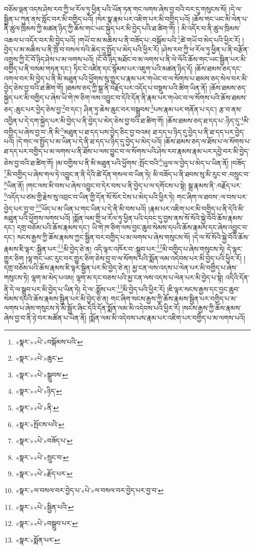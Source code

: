 བཅོམ་ལྡན་འདས་ཤེས་རབ་ཀྱི་ཕ་རོལ་ཏུ་ཕྱིན་པའི་ཡོན་ཏན་གང་ལགས་ཞེས་བྱ་བའི་བར་དུ་གསུངས་སོ། །དེ་ལ་སྦྱིན་པ་ཀུན་ནས་སློང་བར་མི་བགྱིད་པའོ། །སེར་སྣ་རྣམ་པར་འཇིག་པར་མི་བགྱིད་པའོ། །ཆོས་གང་ཡང་མི་ལེན་པ་ནི་ཚུལ་ཁྲིམས་ཀྱི་མཚན་ཉིད་ཀྱི་ཆོས་གང་ཡང་སྐྱེད་པར་མི་བྱེད་པའི་ཐ་ཚིག་གོ། །
མི་འདོར་བ་ནི་ཚུལ་ཁྲིམས་འཆལ་པ་འདོར་བར་མི་བྱེད་པའོ། །གཡོ་བ་མ་མཆིས་པ་ནི་བཟོད་པ་:བསྒོམ་པའི་\footnote{«སྣར་»«པེ་»བསྒོམས་པའི་}ཚེ་གཡོ་བ་མེད་པའི་ཕྱིར་རོ། །བྱེད་པ་མ་མཆིས་པ་ནི་ཁྲོ་བ་བསལ་བའི་ཆེད་དུ་སྤྱོད་པ་མེད་པའི་ཕྱིར་རོ། །ཤེས་རབ་ཀྱི་ཕ་རོལ་ཏུ་ཕྱིན་པ་ནི་བརྩོན་འགྲུས་ཀྱི་ངོ་བོ་ཉིད་ཤེས་པ་མ་ལགས་པའོ། །ངོ་བོ་ཉིད་མཐོང་བ་མ་ལགས་པ་ནི་ལེ་ལོའི་ཆོས་གང་ཡང་སྦྱིན་པར་མི་བགྱིད་པ་ནི་བསམ་གཏན་དང་། ཏིང་ངེ་འཛིན་དང་སྙོམས་པར་འཇུག་པའི་མཚན་ཉིད་དོ། །ཆོས་ཐམས་ཅད་དང་འགལ་བར་མི་བྱེད་པ་ནི་མི་མཐུན་པའི་ཕྱོགས་སུ་གྱུར་པ་རྣམ་པར་གཡེང་བ་ལ་སོགས་པ་ཐམས་ཅད་སེལ་བར་མི་བྱེད་ཅེས་བྱ་བའི་ཐ་ཚིག་གོ། །ཐམས་ཅད་ཀྱི་སྒྲ་ནི་བརྗོད་པར་འདོད་པ་བསྡུས་པའི་ཚིག་ཡིན་ནོ། །ཆོས་ཐམས་ཅད་སྐྱེད་པར་མི་བགྱིད་པ་ཞེས་ཡི་གེ་ཁ་ཅིག་ལས་འབྱུང་བ་དེའི་དོན་ནི་རྣམ་པར་གཡེང་བ་ལ་སོགས་པའི་ཆོས་ཐམས་ཅད་:ཆུང་པར་བྱེད་ཅེས་བྱ་\footnote{«སྣར་»«པེ་»ཆུང་}བ་དང་། ཤིན་ཏུ་ཆེས་ཆུང་བར་བསྒྲུབས་\footnote{«སྣར་»«པེ་»སྒྲུབས་}པས་རྣམ་པར་གནོན་པ་དང་། རྩ་བ་ནས་འབྱིན་པ་དེ་དག་སྐྱེད་པར་མི་བྱེད་པ་ནི་བྱེད་པ་མེད་ཅེས་བྱ་བའི་ཐ་ཚིག་གོ། །ཆོས་ཐམས་ཅད་ཐ་དད་པ་:ཉིད་དུ་\footnote{«སྣར་»«པེ་»ཉིད་}མི་བགྱིད་པ་ཞེས་བྱ་བ་:ནི་མི་\footnote{«སྣར་»«པེ་»ནི་}མཐུན་པ་ཐ་དད་པས་བྱེད་ཅིང་བྱ་བའམ། ཐ་དད་པ་ཉིད་དུ་བྱེད་པ་ནི་ཐ་དད་པར་བྱེད་པའོ། །དེ་གང་ལ་སྤྱོད་པ་མ་ཡིན་པ་དེ་ནི་ཐ་དད་པ་ཉིད་དུ་བྱེད་པ་མེད་པའོ། །ཆོས་ཐམས་ཅད་ལ་ཐོས་པ་ལ་སོགས་པ་ཐ་དད་པར་བགྱིད་པ་མ་ལགས་པ་ནི་ཐོས་པ་ལས་བྱུང་བ་ལ་སོགས་པའི་ཤེས་རབ་རྣམས་རྣམ་པར་དབྱེ་བར་མི་བྱེད་ཅེས་བྱ་བའི་ཐ་ཚིག་གོ། །མ་བགྱིས་པ་ནི་མི་མཐུན་པའི་ཕྱོགས་:སྤོང་བའི་\footnote{«སྣར་»སྤོངས་པའི་}ཡུལ་ལ་བྱེད་པ་མེད་པ་ཡིན་ནོ། །བཟོད་\footnote{«སྣར་»«པེ་»བཟོད་པ་}མི་བགྱིད་པ་ཞེས་གལ་ཏེ་འབྱུང་ན་ནི་དེའི་ཚེ་དོན་གསལ་བ་ཡིན་ཏེ། མི་བཟོད་པ་ནི་ཐབས་སུ་མི་རུང་བ་:བསྲུང་བ་\footnote{«སྣར་»«པེ་»སྲུང་བ་}ཡིན་ནོ། །གང་ལས་མི་བས་པ་ཞེས་འབྱུང་བ་དེར་བས་པ་ནི་བྱེད་པ་ལ་དགོངས་པ་སྟེ། སྒྲ་རྣམས་ནི་:བརྗོད་པར་\footnote{«སྣར་»«པེ་»རྗོད་པར་}འདོད་པ་ཙམ་གྱི་རྗེས་སུ་འབྲང་བ་ཡིན་གྱི་དོན་སོ་སོར་ངེས་པ་མེད་པའི་ཕྱིར་ཏེ། གང་ཞིག་ལ་ཐབས་:ལ་བས་པར་བྱེད་པར་བྱ་བ་\footnote{«སྣར་»ལ་བསལ་བར་བྱེད་པ་«པེ་»ལ་བསལ་བར་བྱེད་པར་བྱ་བ་}ཡོད་པ་མ་ཡིན་པ་གང་ཡིན་པ་དེ་ནི་མི་བས་པའོ། །རྣམ་པར་འཇིག་པར་མི་བགྱིད་པ་ནི་དེའི་མི་མཐུན་པའི་ཕྱོགས་ལགས་པའོ། །སྨོན་ལམ་གྱི་ཕ་རོལ་ཏུ་ཕྱིན་པའི་དབང་དུ་བྱས་ནས་སོ་སོའི་སྐྱེ་བོའི་ཆོས་རྣམས་དང་། དགྲ་བཅོམ་པའི་ཆོས་རྣམས་དང་། ཡི་གེ་ཁ་ཅིག་ལས་བྱང་ཆུབ་སེམས་དཔའི་ཆོས་རྣམས་དང་ཞེས་འབྱུང་བ་དང་། སངས་རྒྱས་ཀྱི་ཆོས་རྣམས་ཀྱང་སྦྱིན་བར་བགྱིད་པ་མ་ལགས་པ་ཞེས་གསུངས་སོ། །དེ་ལ་སོ་སོའི་སྐྱེ་བོའི་ཆོས་རྣམས་ཇི་ལྟར་:སྦྱིན་པར་\footnote{«སྣར་»«པེ་»སྦྱིན་པའི་}མི་བྱེད་ཅེ་ན། འདི་ལྟར་འཁོར་བ་:སྒྲུབ་པར་\footnote{«སྣར་»«པེ་»བསྒྲུབ་པར་}མི་བགྱིད་པ་ཞེས་གསུངས་ཏེ། དེ་ལྟར་གྱུར་ཅིག །ལྷ་གང་ཡང་རུང་བར་གྱུར་ཅིག་ཅེས་བྱ་བ་ལ་སོགས་པའི་སྨོན་ལམ་འདེབས་པར་མི་བྱེད་པའི་ཕྱིར་རོ། །དགྲ་བཅོམ་པའི་ཆོས་རྣམས་ཇི་ལྟར་སྦྱིན་པར་མི་བྱེད་ཅེ་ན། མྱ་ངན་ལས་འདས་པ་ལེན་པར་མི་བགྱིད་པ་ཞེས་གསུངས་ཏེ། ལྷག་མ་མེད་པའམ། ལྷག་མ་དང་བཅས་པའི་མྱ་ངན་ལས་འདས་པ་ལེན་པར་མི་བྱེད་པ་སྟེ། འདིའི་དོན་ནི་དེ་ལ་སྒྲུབ་པར་མི་བྱེད་པ་ཡིན་ཏེ། དེ་ལ་:སྨོས་པར་\footnote{«སྣར་»སྨོན་པར་}མི་བྱེད་པའི་ཕྱིར་རོ། །ཇི་ལྟར་སངས་རྒྱས་དང་བྱང་ཆུབ་སེམས་དཔའི་ཆོས་རྣམས་སྦྱིན་པར་མི་བྱེད་ཅེ་ན། གང་ཞིག་སངས་རྒྱས་ཀྱི་ཆོས་རྣམས་སྦྱིན་པར་བགྱིད་པ་མ་ལགས་པ་ཞེས་གསུངས་ཏེ་མི་སྦྱོར་ཞིང་དེའི་དོན་སྨོན་ལམ་མི་འདེབས་པའི་ཕྱིར་རོ། །སངས་རྒྱས་ཀྱི་ཆོས་རྣམས་ཞེས་བྱ་བ་ནི་ཉེ་བར་མཚོན་པ་ཡིན་ནོ། །སྨོན་ལམ་མི་འདེབས་པས་རྣམ་པར་འཇིག་པར་བགྱིད་པ་མ་ལགས་པའོ། 
